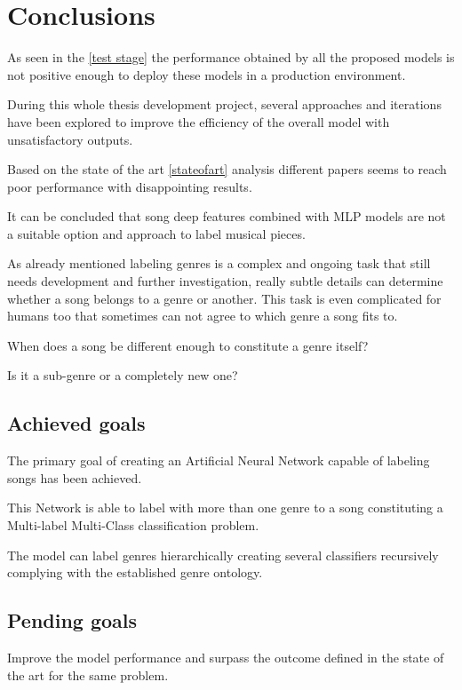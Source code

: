 
\chapter{Conclusions}

\label{conclusions}
As seen in the \ref{test stage} the performance obtained by all the proposed models is not positive enough to deploy these models in a production environment.

During this whole thesis development project, several approaches and iterations have been explored to improve the efficiency of the overall model with unsatisfactory outputs.

Based on the state of the art \ref{stateofart} analysis different papers seems to reach poor performance with disappointing results.

It can be concluded that song deep features combined with MLP models are not a suitable option and approach to label musical pieces. 

As already mentioned labeling genres is a complex and ongoing task that still needs development and further investigation, really subtle details can determine whether a song belongs to a genre or another. This task is even complicated for humans too that sometimes can not agree to which genre a song fits to. 

When does a song be different enough to constitute a genre itself?

Is it a sub-genre or a completely new one?

\section{Achieved goals}
The primary goal of creating an Artificial Neural Network capable of labeling songs has been achieved.

This Network is able to label with more than one genre to a song constituting a Multi-label Multi-Class classification problem.

The model can label genres hierarchically creating several classifiers recursively complying with the established genre ontology.

\section{Pending goals}
Improve the model performance and surpass the outcome defined in the state of the art for the same problem.

